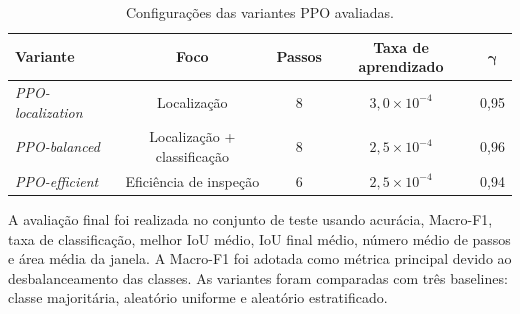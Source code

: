 \begin{table}[htbp]
\centering
\caption{Configurações das variantes PPO avaliadas.}
\label{tab:ppo_variants}
\begin{tabular}{lcccc}
\hline
\textbf{Variante} & \textbf{Foco} & \textbf{Passos} & \textbf{Taxa de aprendizado} & $\boldsymbol{\gamma}$ \\
\hline
\textit{PPO-localization} & Localização & 8 & $3{,}0 \times 10^{-4}$ & 0{,}95 \\
\textit{PPO-balanced} & Localização + classificação & 8 & $2{,}5 \times 10^{-4}$ & 0{,}96 \\
\textit{PPO-efficient} & Eficiência de inspeção & 6 & $2{,}5 \times 10^{-4}$ & 0{,}94 \\
\hline
\end{tabular}
\end{table}

A avaliação final foi realizada no conjunto de teste usando acurácia, Macro-F1, taxa de
classificação, melhor IoU médio, IoU final médio, número médio de passos e área média
da janela. A Macro-F1 foi adotada como métrica principal devido ao desbalanceamento das
classes. As variantes foram comparadas com três baselines: classe majoritária,
aleatório uniforme e aleatório estratificado.
